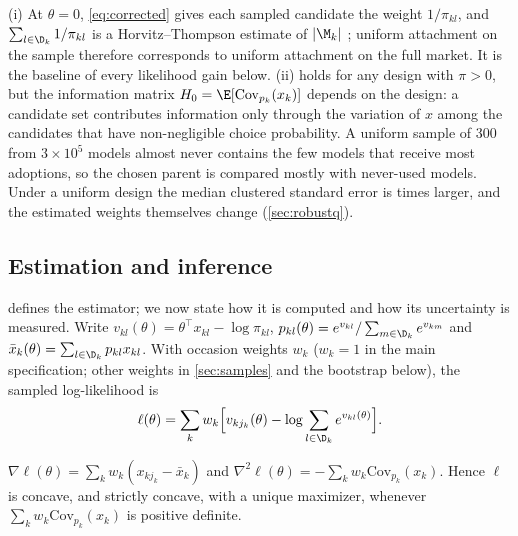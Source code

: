 \begin{remark}
\label{rem:pps}
(i) At $\theta = 0$, \eqref{eq:corrected} gives each sampled candidate the weight $1/\pi_{kl}$, and $\sum_{l \in
\D_k} 1/\pi_{kl}$ is a Horvitz--Thompson estimate of $|\M_k|$ \citep{horvitz1952generalization}; uniform attachment
on the sample therefore corresponds to uniform attachment on the full market. It is the baseline of every likelihood
gain below.
(ii)  holds for any design with $\pi > 0$, but the information matrix $H_0 = \E[\mathrm{Cov}_{p_k}
(x_k)]$ depends on the design: a candidate set contributes information only through the variation of $x$ among the
candidates that have non-negligible choice probability. A uniform sample of 300 from $3 \times 10^5$ models almost
never contains the few models that receive most adoptions, so the chosen parent is compared mostly with never-used
models. Under a uniform design the median clustered standard error is \seRatioUnif{} times larger, and the
estimated weights themselves change (\cref{sec:robustq}).
\end{remark}

\subsection{Estimation and inference}
\label{sec:estimation}

 defines the estimator; we now state how it is computed and how its uncertainty is measured.
Write $v_{kl}(\theta) = \theta^\top x_{kl} - \log \pi_{kl}$, $p_{kl}(\theta) = e^{v_{kl}} / \sum_{m \in \D_k}
e^{v_{km}}$ and $\bar x_k(\theta) = \sum_{l \in \D_k} p_{kl} x_{kl}$. With occasion weights $w_k$ ($w_k = 1$ in the
main specification; other weights in \cref{sec:samples} and the bootstrap below), the sampled log-likelihood is
\begin{equation}
  \ell(\theta) = \sum_k w_k \Big[ v_{kj_k}(\theta) - \log \sum_{l \in \D_k} e^{v_{kl}(\theta)} \Big].
  \label{eq:loglik}
\end{equation}

\begin{lemma}[Concavity]
\label{lem:concave}
$\nabla \ell(\theta) = \sum_k w_k (x_{kj_k} - \bar x_k)$ and $\nabla^2 \ell(\theta) = -\sum_k w_k
\mathrm{Cov}_{p_k}(x_k)$. Hence $\ell$ is concave, and strictly concave, with a unique maximizer, whenever
$\sum_k w_k \mathrm{Cov}_{p_k}(x_k)$ is positive definite.
\end{lemma}

